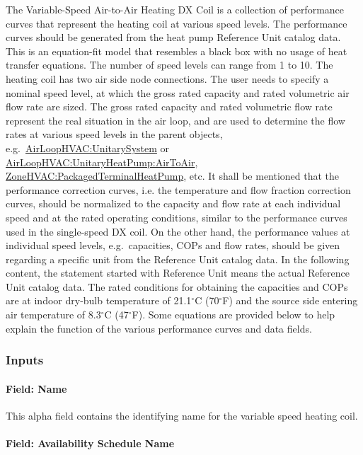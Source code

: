 The Variable-Speed Air-to-Air Heating DX Coil is a collection of performance curves that represent the heating coil at various speed levels. The performance curves should be generated from the heat pump Reference Unit catalog data. This is an equation-fit model that resembles a black box with no usage of heat transfer equations. The number of speed levels can range from 1 to 10. The heating coil has two air side node connections. The user needs to specify a nominal speed level, at which the gross rated capacity and rated volumetric air flow rate are sized. The gross rated capacity and rated volumetric flow rate represent the real situation in the air loop, and are used to determine the flow rates at various speed levels in the parent objects, e.g.~\hyperref[airloophvacunitarysystem]{AirLoopHVAC:UnitarySystem} or \hyperref[airloophvacunitaryheatpumpairtoair]{AirLoopHVAC:UnitaryHeatPump:AirToAir}, \hyperref[zonehvacpackagedterminalheatpump]{ZoneHVAC:PackagedTerminalHeatPump}, etc. It shall be mentioned that the performance correction curves, i.e. the temperature and flow fraction correction curves, should be normalized to the capacity and flow rate at each individual speed and at the rated operating conditions, similar to the performance curves used in the single-speed DX coil. On the other hand, the performance values at individual speed levels, e.g.~capacities, COPs and flow rates, should be given regarding a specific unit from the Reference Unit catalog data. In the following content, the statement started with Reference Unit means the actual Reference Unit catalog data. The rated conditions for obtaining the capacities and COPs are at indoor dry-bulb temperature of 21.1$^\circ$C (70$^\circ$F) and the source side entering air temperature of 8.3$^\circ$C (47$^\circ$F). Some equations are provided below to help explain the function of the various performance curves and data fields.

\subsubsection{Inputs}\label{inputs-21-001}

\paragraph{Field: Name}\label{field-name-20-000}

This alpha field contains the identifying name for the variable speed heating coil.

\paragraph{Field: Availability Schedule Name}\label{field-availability-schedule-name-16-002}

